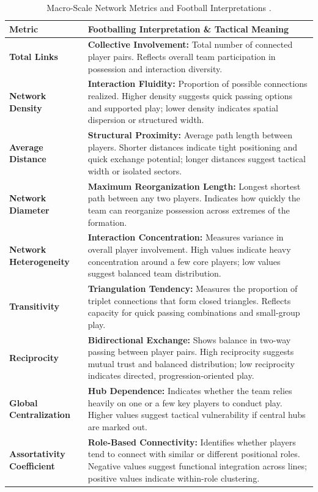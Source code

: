 \documentclass[12pt, a4paper]{article}
\begin{document}
\begin{table}[htbp]
    \centering
    \small
    \caption{Macro-Scale Network Metrics and Football Interpretations \cite{gama2026stoch}.}
    \label{tab:gama_macro_metrics}
    \begin{tabularx}{\textwidth}{l X}
        \toprule
        \textbf{Metric} & \textbf{Footballing Interpretation \& Tactical Meaning} \\
        \midrule
        \textbf{Total Links} & \textbf{Collective Involvement:} Total number of connected player pairs. Reflects overall team participation in possession and interaction diversity. \\
        \addlinespace[3pt]
        \textbf{Network Density} & \textbf{Interaction Fluidity:} Proportion of possible connections realized. Higher density suggests quick passing options and supported play; lower density indicates spatial dispersion or structured width. \\
        \addlinespace[3pt]
        \textbf{Average Distance} & \textbf{Structural Proximity:} Average path length between players. Shorter distances indicate tight positioning and quick exchange potential; longer distances suggest tactical width or isolated sectors. \\
        \addlinespace[3pt]
        \textbf{Network Diameter} & \textbf{Maximum Reorganization Length:} Longest shortest path between any two players. Indicates how quickly the team can reorganize possession across extremes of the formation. \\
        \addlinespace[3pt]
        \textbf{Network Heterogeneity} & \textbf{Interaction Concentration:} Measures variance in overall player involvement. High values indicate heavy concentration around a few core players; low values suggest balanced team distribution. \\
        \addlinespace[3pt]
        \textbf{Transitivity} & \textbf{Triangulation Tendency:} Measures the proportion of triplet connections that form closed triangles. Reflects capacity for quick passing combinations and small-group play. \\
        \addlinespace[3pt]
        \textbf{Reciprocity} & \textbf{Bidirectional Exchange:} Shows balance in two-way passing between player pairs. High reciprocity suggests mutual trust and balanced distribution; low reciprocity indicates directed, progression-oriented play. \\
        \addlinespace[3pt]
        \textbf{Global Centralization} & \textbf{Hub Dependence:} Indicates whether the team relies heavily on one or a few key players to conduct play. Higher values suggest tactical vulnerability if central hubs are marked out. \\
        \addlinespace[3pt]
        \textbf{Assortativity Coefficient} & \textbf{Role-Based Connectivity:} Identifies whether players tend to connect with similar or different positional roles. Negative values suggest functional integration across lines; positive values indicate within-role clustering. \\
        \bottomrule
    \end{tabularx}
\end{table}
\end{document}
